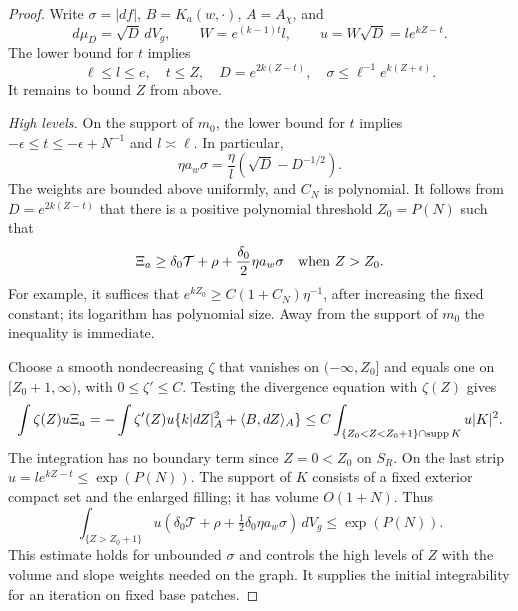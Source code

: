 \begin{proof}
Write $\sigma=|df|$, $B=K_a(w,\cdot)$, $A=A_\chi$, and
\[
 d\mu_D=\sqrt D\,dV_g,\qquad
 W=e^{(k-1)t}l,\qquad u=W\sqrt D=l e^{kZ-t}.
\]
The lower bound for $t$ implies
\begin{equation}\label{eq:elliptic:elementary-distortion}
 \ell\le l\le e,\quad t\le Z,\quad
 D=e^{2k(Z-t)},\quad
 \sigma\le\ell^{-1}e^{k(Z+\epsilon)}.
\end{equation}
It remains to bound $Z$ from above.

\medskip\noindent\emph{High levels.}
On the support of $m_0$, the lower bound for $t$ implies
$-\epsilon\le t\le-\epsilon+N^{-1}$ and $l\asymp\ell$.
In particular,
\[
 \eta a_w\sigma=\frac\eta l(\sqrt D-D^{-1/2}).
\]
The weights are bounded above uniformly, and $C_N$ is polynomial.
It follows from $D=e^{2k(Z-t)}$ that there is a positive polynomial
threshold $Z_0=P(N)$ such that
\begin{equation}\label{eq:elliptic:high-source}
 \Xi_a\ge\delta_0\mathcal T+\rho
                   +\frac{\delta_0}2\eta a_w\sigma
 \quad\hbox{when }Z>Z_0.
\end{equation}
For example, it suffices that
$e^{kZ_0}\ge C(1+C_N)\eta^{-1}$, after increasing the fixed constant;
its logarithm has polynomial size.  Away from the support of $m_0$
the inequality is immediate.

Choose a smooth nondecreasing $\zeta$ that vanishes on $(-\infty,Z_0]$
and equals one on $[Z_0+1,\infty)$, with $0\le\zeta'\le C$.
Testing the divergence equation with $\zeta(Z)$ gives
\[
 \int \zeta(Z)u\Xi_a
  =-\int\zeta'(Z)u\{k|dZ|_A^2+\langle B,dZ\rangle_A\}
  \le C\int_{\{Z_0<Z<Z_0+1\}\cap\operatorname{supp} K}u|K|^2.
\]
The integration has no boundary term since $Z=0<Z_0$ on $S_R$.
On the last strip $u=l e^{kZ-t}\le\exp(P(N))$.
The support of $K$ consists of a fixed exterior compact set and the
enlarged filling; it has volume $O(1+N)$.  Thus
\begin{equation}\label{eq:elliptic:high-integral}
 \int_{\{Z>Z_0+1\}}u
       (\delta_0\mathcal T+\rho+\tfrac12\delta_0\eta a_w\sigma)
       \,dV_g\le\exp(P(N)).
\end{equation}
This estimate holds for unbounded $\sigma$ and controls the high
levels of $Z$ with the volume and slope weights needed on the graph.
It supplies the initial integrability for an iteration on fixed base patches.


\end{proof}
